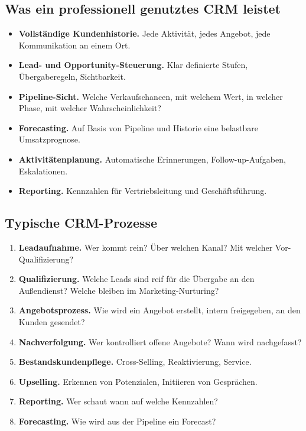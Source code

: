 \documentclass[11pt,a4paper,oneside]{article}
\newcommand{\fachbegriff}[1]{\textbf{#1}}
\begin{document}
\subsection{Was ein professionell genutztes CRM leistet}

\begin{itemize}
  \item \textbf{Vollständige Kundenhistorie.} Jede Aktivität, jedes Angebot, jede Kommunikation an einem Ort.
  \item \textbf{Lead- und Opportunity-Steuerung.} Klar definierte Stufen, Übergaberegeln, Sichtbarkeit.
  \item \textbf{Pipeline-Sicht.} Welche Verkaufschancen, mit welchem Wert, in welcher Phase, mit welcher Wahrscheinlichkeit?
  \item \textbf{Forecasting.} Auf Basis von Pipeline und Historie eine belastbare Umsatzprognose.
  \item \textbf{Aktivitätenplanung.} Automatische Erinnerungen, Follow-up-Aufgaben, Eskalationen.
  \item \textbf{Reporting.} Kennzahlen für Vertriebsleitung und Geschäftsführung.
\end{itemize}

\subsection{Typische CRM-Prozesse}

\begin{enumerate}
  \item \fachbegriff{Leadaufnahme.} Wer kommt rein? Über welchen Kanal? Mit welcher Vor-Qualifizierung?
  \item \fachbegriff{Qualifizierung.} Welche Leads sind reif für die Übergabe an den Außendienst? Welche bleiben im Marketing-Nurturing?
  \item \fachbegriff{Angebotsprozess.} Wie wird ein Angebot erstellt, intern freigegeben, an den Kunden gesendet?
  \item \fachbegriff{Nachverfolgung.} Wer kontrolliert offene Angebote? Wann wird nachgefasst?
  \item \fachbegriff{Bestandskundenpflege.} Cross-Selling, Reaktivierung, Service.
  \item \fachbegriff{Upselling.} Erkennen von Potenzialen, Initiieren von Gesprächen.
  \item \fachbegriff{Reporting.} Wer schaut wann auf welche Kennzahlen?
  \item \fachbegriff{Forecasting.} Wie wird aus der Pipeline ein Forecast?
\end{enumerate}
\end{document}
